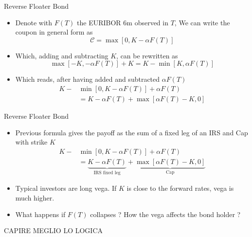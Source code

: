 \documentclass{beamer}
\begin{document}
\begin{frame}{Reverse Floater Bond}
	\begin{itemize}
		\item Denote with $F(T)$ the EURIBOR 6m observed in $T$, We can write the coupon in general form as
		\begin{equation}
			\mathcal{C}=\max[0, K-\alpha F(T)]
		\end{equation}
		\item Which, adding and subtracting $K$, can be rewritten as
		\begin{equation}
			\max[-K,-\alpha F(T)] + K = K - \min[K,\alpha F(T)]
		\end{equation}
		\item Which reads, after having added and subtracted $\alpha F(T)$
		\begin{equation}
			\begin{aligned}
				K-&\min[0,K-\alpha F(T)]+\alpha F(T) \\ &= K - \alpha F(T) + \max[\alpha F(T)-K,0]
			\end{aligned}
		\end{equation}
	\end{itemize}
\end{frame}

\begin{frame}{Reverse Floater Bond}
	\begin{itemize}
		\item Previous formula gives the payoff as the sum of a fixed leg of an IRS and Cap with strike $K$
		\begin{equation}
			\begin{aligned}
				K-&\min[0,K-\alpha F(T)]+\alpha F(T) \\ &= \underbrace{K - \alpha F(T)}_{\text{IRS fixed leg}} + \underbrace{\max[\alpha F(T)-K,0]}_{\text{Cap}}
			\end{aligned}
		\end{equation}
		\item Typical investors are long vega. If $K$ is close to the forward rates, vega is much higher.
		\item What happens if $F(T)$ collapses ? How the vega affects the bond holder ?
	\end{itemize}
	CAPIRE MEGLIO LO LOGICA
\end{frame}
\end{document}
